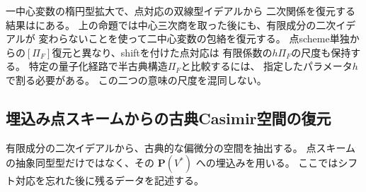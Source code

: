 \begin{remark}[先行結果と尺度の意味]
一中心変数の楕円型拡大で、点対応の双線型イデアルから
二次関係を復元する結果は\cite[Proposition~4.2.5]{LeBruynSmithVdBCentral}にある。
上の命題では中心三次商を取った後にも、有限成分の二次イデアルが
変わらないことを使って二中心変数の包絡を復元する。
点scheme単独からの$[\Pi_F]$復元と異なり、shiftを付けた点対応は
有限係数の$h\Pi_F$の尺度も保持する。
特定の量子化経路で半古典構造$\Pi_F$と比較するには、
指定したパラメータ$h$で割る必要がある。
この二つの意味の尺度を混同しない。
\end{remark}

\subsection{埋込み点スキームからの古典Casimir空間の復元}

\label{subsec:point-gradient-reconstruction}

有限成分の二次イデアルから、古典的な偏微分の空間を抽出する。
点スキームの抽象同型型だけではなく、その $\mathbf P(V^*)$ への埋込みを用いる。
ここではシフト対応を忘れた後に残るデータを記述する。

